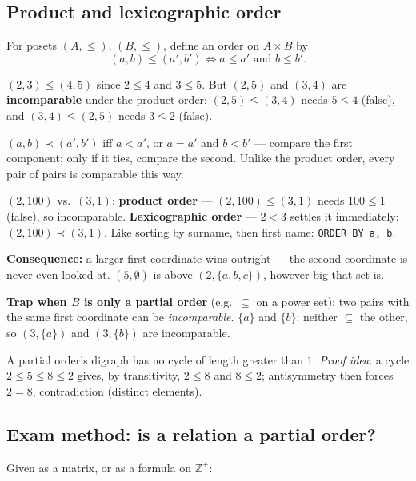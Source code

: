 \documentclass{fkt-notes}
\theoremstyle{definition}
\begin{document}
\subsection{Product and lexicographic order}
%
\begin{rulebox}[title=Theorem 1 (product partial order)]
  For posets $(A,\le)$, $(B,\le)$, define an order on $A\times B$ by
  \[(a,b)\le(a',b') \iff a\le a' \text{ and } b\le b'.\]
\end{rulebox}
$(2,3)\le(4,5)$ since $2\le4$ and $3\le5$. But $(2,5)$ and $(3,4)$ are
\textbf{incomparable} under the product order: $(2,5)\le(3,4)$ needs
$5\le4$ (false), and $(3,4)\le(2,5)$ needs $3\le2$ (false).

\begin{keybox}[title=Lexicographic (dictionary) order]
  $(a,b)\prec(a',b')$ iff $a<a'$, or $a=a'$ and $b<b'$ --- compare the
  first component; only if it ties, compare the second. Unlike the
  product order, every pair of pairs is comparable this way.
\end{keybox}
$(2,100)$ vs.\ $(3,1)$: \textbf{product order} --- $(2,100)\le(3,1)$
needs $100\le1$ (false), so incomparable. \textbf{Lexicographic order}
--- $2<3$ settles it immediately: $(2,100)\prec(3,1)$.
%
Like sorting by surname, then first name: \texttt{ORDER BY a, b}.

\textbf{Consequence:} a larger first coordinate wins outright --- the
second coordinate is never even looked at. $(5, \emptyset)$ is above
$(2, \{a, b, c\})$, however big that set is.

\textbf{Trap when $B$ is only a partial order} (e.g.\ $\subseteq$ on a
power set): two pairs with the same first coordinate can be
\emph{incomparable}. $\{a\}$ and $\{b\}$: neither $\subseteq$ the other,
so $(3, \{a\})$ and $(3, \{b\})$ are incomparable.


\begin{rulebox}[title=Theorem 2 (no cycles)]
  A partial order's digraph has no cycle of length greater than $1$.
  \emph{Proof idea}: a cycle $2\le5\le8\le2$ gives, by transitivity,
  $2\le8$ and $8\le2$; antisymmetry then forces $2=8$, contradiction
  (distinct elements).
\end{rulebox}

\subsection{Exam method: is a relation a partial order?}
%
Given as a matrix, or as a formula on $\mathbb{Z}^+$:
\end{document}
